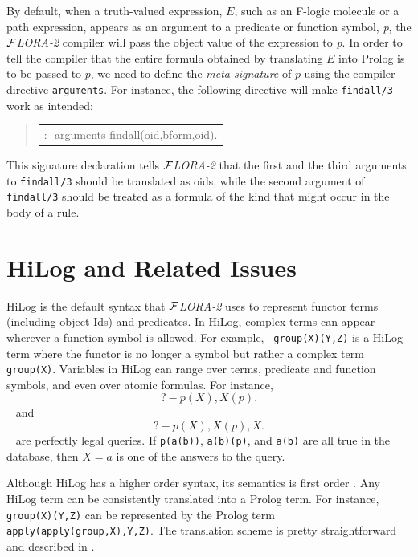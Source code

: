 \documentclass[11pt]{article}
\newenvironment{qrules}{\begin{quote}\tt\begin{tabular}[t]{l}}%
{\end{tabular}\end{quote}}
\newcommand{\FLORA}{{\mbox{${\cal F}${\small\it LORA}\rm\emph{-2}}}\xspace}
\newcommand{\fl}{\mbox{F-logic}\xspace}
\begin{document}
%
By default, when a truth-valued expression, $E$, such as an \fl molecule or
a path expression, appears as an argument to a predicate or function
symbol, {\it p}, the \FLORA compiler will pass the object value of the
expression to {\it p}. In order to tell the compiler that the entire
formula obtained by translating $E$ into Prolog is to be passed to $p$, we
need to define the \emph{meta signature} of $p$ using the compiler
directive {\tt arguments}.  For instance, the following directive will make
{\tt findall/3} work as intended:
\begin{qrules}
:- arguments findall(oid,bform,oid).
\end{qrules}
This signature declaration tells \FLORA that the first and the third
arguments to {\tt findall/3} should be translated as oids, while the second
argument of {\tt findall/3} should be treated as a formula of the kind that
might occur in the body of a rule.



\section{HiLog and Related Issues} \label{sec:hilog}


%
HiLog \cite{hilog-jlp} is the default syntax that \FLORA uses to represent
functor terms (including object Ids) and predicates.  In HiLog, complex
terms can appear wherever a function symbol is allowed. For example, {\tt
  group(X)(Y,Z)} is a HiLog term where the functor is no longer a symbol
but rather a complex term {\tt group(X)}. Variables in HiLog can range over
terms, predicate and function symbols, and even over atomic formulas. For
instance,
{\tt
\begin{equation}
 ?- p(X), X(p).
\end{equation}
}
\noindent
and
{\tt
\begin{equation}\label{eq-hilog-notallowed}
 ?- p(X), X(p), X.  
\end{equation}
}
are perfectly legal queries. If {\tt p(a(b))}, {\tt a(b)(p)},
and {\tt a(b)} are all true in the database, then $X=a$ is one of the
answers to the query.

%
Although HiLog has a higher order syntax, its semantics is first order
\cite{hilog-jlp}. Any HiLog term can be consistently translated into a
Prolog term. For instance, {\tt group(X)(Y,Z)} can be represented by the
Prolog term {\tt apply(apply(group,X),Y,Z)}. The translation scheme is
pretty straightforward and described in \cite{hilog-jlp}.
\end{document}
